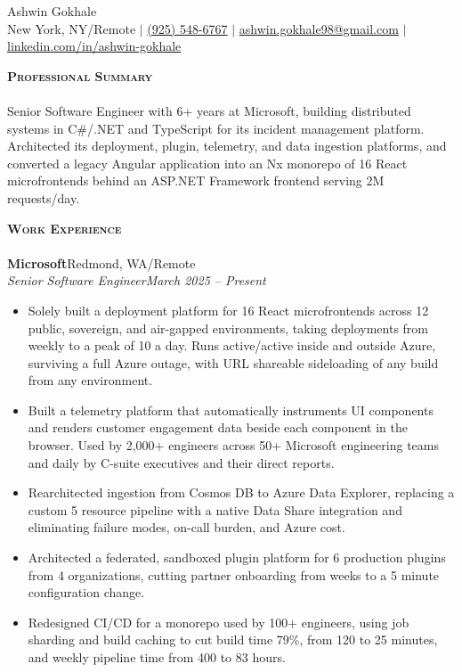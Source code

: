 \documentclass[letterpaper, 10pt]{article}
\newcommand{\lineunder}{
    \vspace*{-8pt} \\
    \hspace*{-18pt} \hrulefill \\
}
\newcommand{\header}[1]{
    \vspace*{10pt}
    {
        \hspace*{-18pt}\vspace*{4pt}
        {\large\textbf{\textsc{#1}}}
    }
    \vspace*{-6pt} \lineunder
}
\newcommand{\contact}[2]{
    \vspace*{-32pt}
    \begin{center}
        {\Huge #1}
        \vspace*{5pt}
        \\
        #2
    \end{center}
    \vspace*{-10pt}
}
\newcommand{\company}[2]{
    \textbf{#1}\hfill #2\\[0pt]
}
\newcommand{\role}[2]{
    \Needspace{5\baselineskip}
    \textit{#1}\hfill \textit{#2}\\[-2pt]
}
\begin{document}
\contact{Ashwin Gokhale}{
    New York, NY/Remote $\vert$
    \href{tel:+19255486767}{(925) 548-6767} $\vert$
    \href{mailto:ashwin.gokhale98@gmail.com}{ashwin.gokhale98@gmail.com} $\vert$
    \href{https://www.linkedin.com/in/ashwin-gokhale/}{linkedin.com/in/ashwin-gokhale}
}

\header{Professional Summary}
Senior Software Engineer with 6+ years at Microsoft, building distributed systems in C\#/.NET and TypeScript for its incident management platform. Architected its deployment, plugin, telemetry, and data ingestion platforms, and converted a legacy Angular application into an Nx monorepo of 16 React microfrontends behind an ASP.NET Framework frontend serving 2M requests/day.

\header{Work Experience}
\company{Microsoft}{Redmond, WA/Remote}
\role{Senior Software Engineer}{March 2025 -- Present}
\begin{itemize}
    \item Solely built a deployment platform for 16 React microfrontends across 12 public, sovereign, and air-gapped environments, taking deployments from weekly to a peak of 10 a day. Runs active/active inside and outside Azure, surviving a full Azure outage, with URL shareable sideloading of any build from any environment.
    \item Built a telemetry platform that automatically instruments UI components and renders customer engagement data beside each component in the browser. Used by 2,000+ engineers across 50+ Microsoft engineering teams and daily by C-suite executives and their direct reports.
    \item Rearchitected ingestion from Cosmos DB to Azure Data Explorer, replacing a custom 5 resource pipeline with a native Data Share integration and eliminating failure modes, on-call burden, and Azure cost.
    \item Architected a federated, sandboxed plugin platform for 6 production plugins from 4 organizations, cutting partner onboarding from weeks to a 5 minute configuration change.
    \item Redesigned CI/CD for a monorepo used by 100+ engineers, using job sharding and build caching to cut build time 79\%, from 120 to 25 minutes, and weekly pipeline time from 400 to 83 hours.
\end{itemize}
\end{document}
